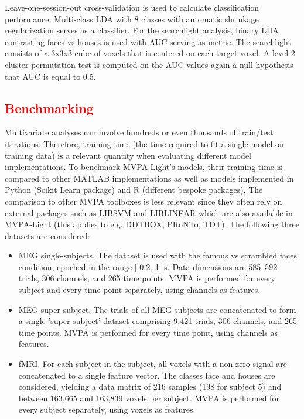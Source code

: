 \documentclass[utf8]{frontiersSCNS} %
\newcommand{\red}[1]{\textcolor{red}{#1}}
\begin{document}
 Leave-one-session-out cross-validation is used to calculate classification performance. Multi-class LDA with 8 classes with automatic shrinkage regularization serves as a classifier. For the searchlight analysis, binary LDA contrasting faces vs houses is used with AUC serving as metric. The searchlight consists of a 3x3x3 cube of voxels that is centered on each target voxel. A level 2 cluster permutation test is computed on the AUC values again a null hypothesis that AUC is equal to 0.5. 

\red{\subsection{Benchmarking}}

Multivariate analyses can involve hundreds or even thousands of train/test iterations. Therefore,  training time (the time required to fit a single model on training data) is a relevant quantity when evaluating different model implementations. To benchmark MVPA-Light's models, their training time is compared to other MATLAB implementations as well as models implemented in Python (Scikit Learn package) and R (different bespoke packages). The comparison to other MVPA toolboxes is less relevant since they often rely on external packages such as LIBSVM and LIBLINEAR which are also available in MVPA-Light (this applies to e.g. DDTBOX, PRoNTo, TDT). The following three datasets are considered:


\begin{itemize}
    \item MEG single-subjects. The \cite{Wakeman2015ADataset} dataset is used with the famous vs scrambled faces condition, epoched in the range [-0.2, 1] s. Data dimensions are 585--592 trials, 306 channels, and 265 time points. MVPA is performed for every subject and every time point separately, using channels as features.
    \item MEG super-subject. The trials of all MEG subjects are concatenated to form a single 'super-subject' dataset comprising 9,421 trials, 306 channels, and 265 time points. MVPA is performed for every time point, using channels as features.
    \item fMRI. For each subject in the \cite{Haxby2001} subject, all voxels with a non-zero signal are concatenated to a single feature vector. The classes face and houses are considered, yielding a data matrix of 216 samples (198 for subject 5) and between 163,665 and 163,839 voxels per subject. MVPA is performed for every subject separately, using voxels as features.
\end{itemize}
\end{document}
